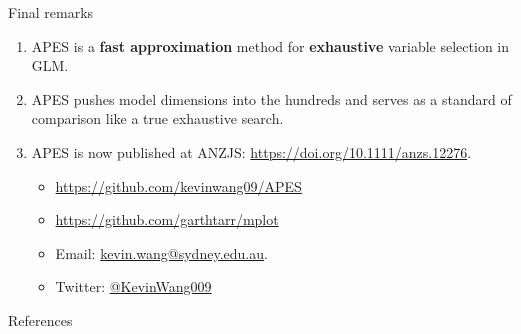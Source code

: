 \documentclass[12pt,aspectratio=169]{beamer}
\begin{document}
\begin{frame}{Final remarks}
\begin{enumerate}
	\item APES is a \textbf{fast approximation} method for \textbf{exhaustive} variable selection in GLM. 
	\item APES pushes model dimensions into the hundreds and serves as a standard of comparison like a true exhaustive search. 
	\item APES is now published at ANZJS: \url{https://doi.org/10.1111/anzs.12276}. 
	\begin{itemize}
		\item \href{https://github.com/kevinwang09/APES}{https://github.com/kevinwang09/APES}
		\item \href{https://github.com/garthtarr/mplot}{https://github.com/garthtarr/mplot}
		\item Email: \href{mailto:kevin.wang@sydney.edu.au}{kevin.wang@sydney.edu.au}. 
		\item Twitter: \href{https://twitter.com/KevinWang009}{@KevinWang009}
	\end{itemize}
\end{enumerate}
\end{frame}



\begin{frame}{References}
\end{frame}
\end{document}
